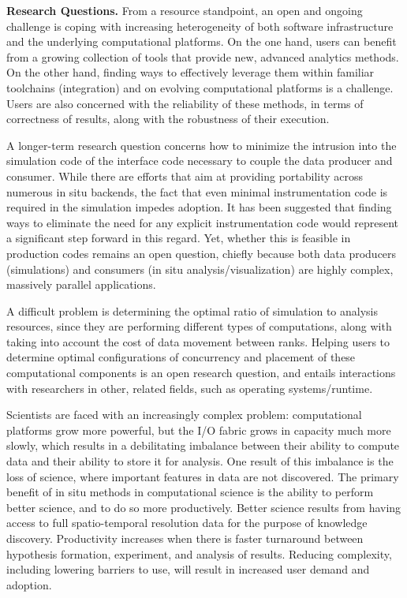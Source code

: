 \begin{refsection}
\medskip\noindent
\textbf{\sffamily Research Questions.} 
From a resource standpoint, an open and ongoing challenge is coping with increasing heterogeneity of both software infrastructure and the underlying computational platforms. 
On the one hand, users can benefit from a growing collection of tools that provide new, advanced analytics methods. 
On the other hand, finding ways to effectively leverage them within familiar toolchains (integration) and on evolving computational platforms is a challenge. 
Users are also concerned with the reliability of these methods, in terms of correctness of results, along with the robustness of their execution.

A longer-term research question concerns how to minimize the intrusion into the simulation code of the interface code necessary to couple the data producer and consumer. 
While there are efforts that aim at providing portability across numerous in situ backends, the fact that even minimal instrumentation code is required in the simulation impedes adoption. 
It has been suggested that finding ways to eliminate the need for any explicit instrumentation code would represent a significant step forward in this regard. 
Yet, whether this is feasible in production codes remains an open question, chiefly because both data producers (simulations) and consumers (in situ analysis/visualization) are highly complex, massively parallel applications. 

A difficult problem is determining the optimal ratio of simulation to analysis resources, since they are performing different types of computations, along with taking into account the cost of data movement between ranks. 
Helping users to determine optimal configurations of concurrency and placement of these computational components is an open research question, and entails interactions with researchers in other, related fields, such as operating systems/runtime.

Scientists are faced with an increasingly complex problem: computational platforms grow more powerful, but the I/O fabric grows in capacity much more slowly, which results in a debilitating imbalance between their ability to compute data and their ability to store it for analysis. 
One result of this imbalance is the loss of science, where important features in data are not discovered. 
The primary benefit of in situ methods in computational science is the ability to perform better science, and to do so more productively. 
Better science results from having access to full spatio-temporal resolution data for the purpose of knowledge discovery. 
Productivity increases when there is faster turnaround between hypothesis formation, experiment, and analysis of results. 
Reducing complexity, including lowering barriers to use, will result in increased user demand and adoption. 


\end{refsection}
